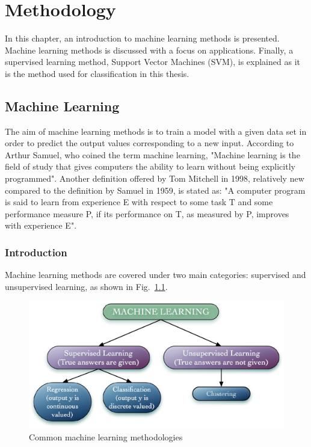 \chapter{Methodology}

In this chapter, an introduction to machine learning methods is presented. 
Machine learning methods is discussed with a focus on applications.
Finally, a supervised learning method, Support Vector Machines (SVM), is explained as it is the method used for classification in this thesis.

\section{Machine Learning}

The aim of machine learning methods is to train a model with a given data set in order to predict the output values corresponding to a new input. 
According to Arthur Samuel, who coined the term machine learning, "Machine learning is the field of study that gives computers the ability to learn without being explicitly programmed". 
Another definition offered by Tom Mitchell in 1998, relatively new compared to the definition by Samuel in 1959, is stated as: "A computer program is said to learn from experience E with respect to some task T and some performance measure P, if its performance on T, as measured by P, improves with experience E".

\subsection{Introduction}
Machine learning methods are covered under two main categories: supervised and unsupervised learning, as shown in Fig.~\ref{fig:machineLearningMethodsSerious}. 

\begin{figure}
\begin{center}
\includegraphics[width=14cm]{figures/machineLearningMethodsSerious}    %
\caption{Common machine learning methodologies} 
\label{fig:machineLearningMethodsSerious}
\end{center}
\end{figure}

